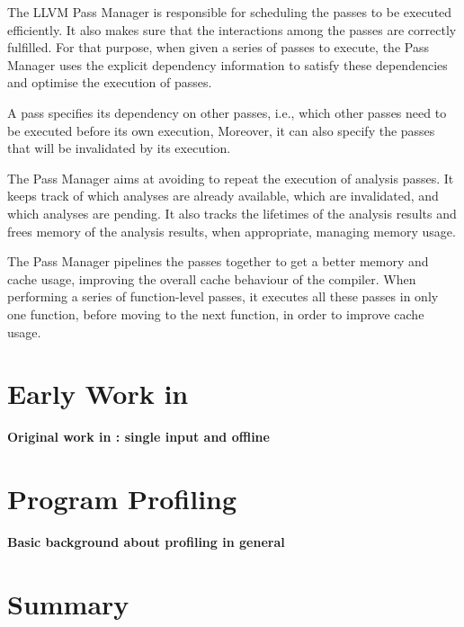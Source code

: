 The LLVM Pass Manager is responsible for scheduling the passes to be executed efficiently.
It also makes sure that the interactions among the passes are correctly fulfilled.
For that purpose, when given a series of passes to execute, the Pass Manager uses the explicit dependency information to satisfy these dependencies and optimise the execution of passes.

A pass specifies its dependency on other passes, i.e., which other passes need to be executed before its own execution,
Moreover, it can also specify the passes that will be invalidated by its execution.

The Pass Manager aims at avoiding to repeat the execution of analysis passes.
It keeps track of which analyses are already available, which are invalidated, and which analyses are pending.
It also tracks the lifetimes of the analysis results and frees memory of the analysis results, when appropriate, managing memory usage.

The Pass Manager pipelines the passes together to get a better memory and cache usage, improving the overall cache behaviour of the compiler.
When performing a series of function-level passes, it executes all these passes in only one function, before moving to the next function, in order to improve cache usage.

\section{Early Work in {\IterComp}}

\textbf{Original work in {\IterComp}: single input and offline}

\section{Program Profiling}

\textbf{Basic background about profiling in general}

\section{Summary}
